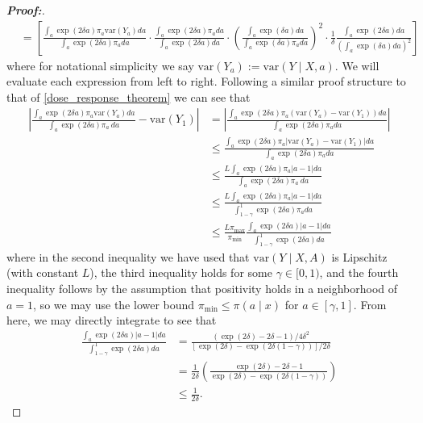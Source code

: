 \documentclass[11pt,twoside]{article}
\newcommand{\var}{\text{var}}
\theoremstyle{definition}
\theoremstyle{remark}
\begin{document}
\begin{proof}[\textbf{Proof:}]
\begin{align*}
    &= \left[ \frac{\int_a \exp(2 \delta a) \pi_a\var(Y_a) da}{\int_a \exp(2 \delta a) \pi_a da }  \cdot \frac{\int_a \exp(2 \delta a) \pi_a  da}{ \int_a \exp(2 \delta a) da } \cdot \left( \frac{ \int_a \exp(\delta a) da }{\int_a  \exp(\delta a) \pi_a  da } \right)^2 \cdot \frac{1}{\delta} \frac{\int_a \exp(2 \delta a)  da}{\left( \int_a \exp(\delta a) da \right)^2} \right]
\end{align*}
where for notational simplicity we say $\var(Y_a) := \var(Y \mid X, a)$. We will evaluate each expression from left to right. Following a similar proof structure to that of \cref{dose_response_theorem} we can see that
\begin{align*}
     \left| \frac{\int_a \exp(2 \delta a) \pi_a \var(Y_a) da}{\int_a \exp(2 \delta a) \pi_a \ da } - \var(Y_1)\right| &= \left| \frac{\int_a \exp(2 \delta a) \pi_a (\var(Y_a) - \var(Y_1)) da}{\int_a \exp(2 \delta a) \pi_a da } \right| \\
     &\leq  \frac{\int_a \exp(2 \delta a) \pi_a \big|\var(Y_a) - \var(Y_1)\big| da}{\int_a \exp(2 \delta a) \pi_a da } \\
     &\leq \frac{L\int_a \exp(2 \delta a) \pi_a \big|a - 1 \big| da}{\int_a \exp(2 \delta a) \pi_a \ da } \\
     &\leq \frac{L \int_a \exp(2 \delta a) \pi_a \big|a - 1 \big| da}{\int^1_{1 - \gamma} \exp(2 \delta a) \pi_a da } \\
     &\leq \frac{L \pi_{\max}}{\pi_{\min}}\frac{ \int_a \exp(2 \delta a) \big|a - 1 \big| da}{\int^1_{1 - \gamma} \exp(2 \delta a) da } 
\end{align*}
where in the second inequality we have used that $\var(Y \mid X, A)$ is Lipschitz (with constant $L$), the third inequality holds for some $\gamma \in [0, 1)$, and the fourth inequality follows by the assumption that positivity holds in a neighborhood of $a = 1$, so we may use the lower bound $\pi_{\min} \leq \pi(a \mid x)$ for $a \in [\gamma, 1]$. From here, we may directly integrate to see that
\begin{align*}
    \frac{ \int_a \exp(2 \delta a)\big|a - 1 \big| da}{\int^1_{1 - \gamma} \exp(2 \delta a) da } &= \frac{(\exp(2 \delta) - 2\delta - 1) / 4 \delta^2}{[\exp(2 \delta) - \exp(2 \delta (1 - \gamma))] / 2 \delta } \\
    &= \frac{1}{2 \delta} \left( \frac{\exp(2 \delta) - 2\delta - 1}{\exp(2 \delta) - \exp(2 \delta (1 - \gamma))} \right) \\
    &\leq \frac{1}{2 \delta}.
\end{align*}

\end{proof}
\end{document}
